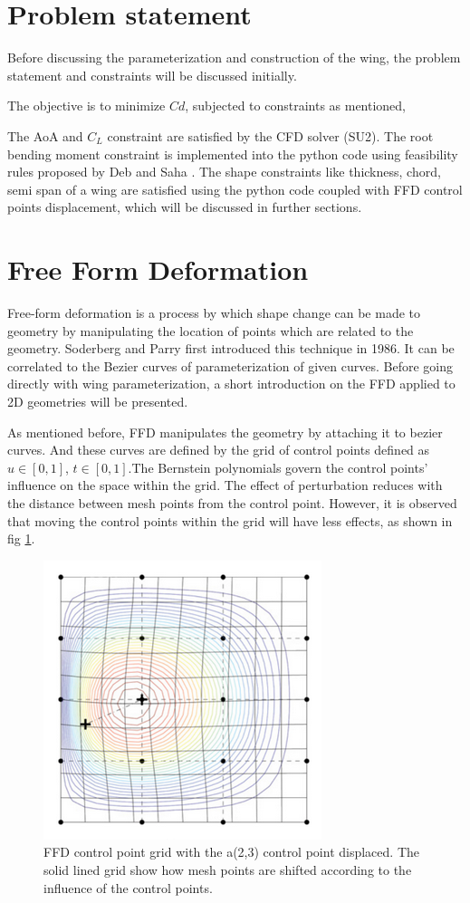 \section{Problem statement}
Before discussing the parameterization and construction of the wing, the problem statement and constraints will be discussed initially.

The objective is to minimize $Cd$, subjected to constraints as mentioned,


The AoA and $C_L$ constraint are satisfied by the CFD solver (SU2). The root bending moment constraint is implemented into the python code using feasibility rules proposed by Deb and Saha \cite{Deb}. The shape constraints like thickness, chord, semi span of a wing are satisfied using the python code coupled with FFD control points displacement, which will be discussed in further sections.

\section{Free Form Deformation}
Free-form deformation is a process by which shape change can be made to geometry by manipulating the location of points which are related to the geometry. Soderberg and Parry first introduced this technique in 1986. It can be correlated to the Bezier curves of parameterization of given curves. Before going directly with wing parameterization, a short introduction on the FFD applied to 2D geometries will be presented.

As mentioned before, FFD manipulates the geometry by attaching it to bezier curves. And these curves are defined by the grid of control points defined as $u \in[0,1]$, $t\in[0,1]$.The Bernstein polynomials govern the control points' influence on the space within the grid. The effect of perturbation reduces with the distance between mesh points from the control point. However, it is observed that moving the control points within the grid will have less effects, as shown in fig \ref{ffd_effect}.

\begin{figure}
    \centering
    \includegraphics[scale=0.56]{figures/ffd5.png}
    \caption{FFD control point grid with the a(2,3) control point displaced. The solid lined grid show how mesh points are shifted according to the influence of the control points\cite{ffd_book}.}
    \label{ffd_effect}
\end{figure}

